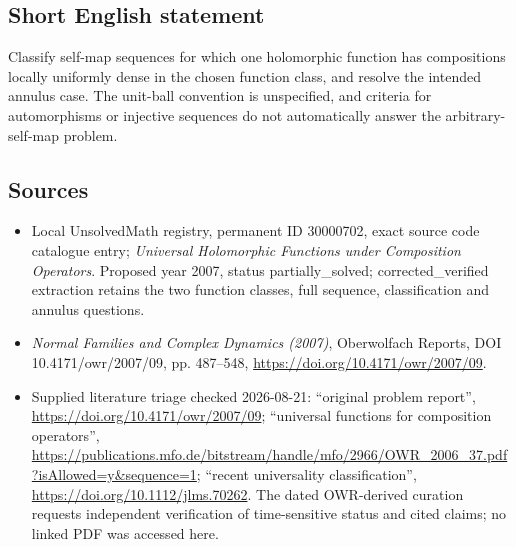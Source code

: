 \documentclass[11pt]{article}
\begin{document}
\subsection{Short English statement}
Classify self-map sequences for which one holomorphic function has compositions locally uniformly dense in the chosen function class, and resolve the intended annulus case. The unit-ball convention is unspecified, and criteria for automorphisms or injective sequences do not automatically answer the arbitrary-self-map problem.
\subsection{Sources}
\begin{itemize}
\item Local UnsolvedMath registry, permanent ID 30000702, exact source code catalogue entry; \emph{Universal Holomorphic Functions under Composition Operators}. Proposed year 2007, status partially\_solved; corrected\_verified extraction retains the two function classes, full sequence, classification and annulus questions.
\item \emph{Normal Families and Complex Dynamics (2007)}, Oberwolfach Reports, DOI 10.4171/owr/2007/09, pp. 487--548, \url{https://doi.org/10.4171/owr/2007/09}.
\item Supplied literature triage checked 2026-08-21: ``original problem report'', \url{https://doi.org/10.4171/owr/2007/09}; ``universal functions for composition operators'', \url{https://publications.mfo.de/bitstream/handle/mfo/2966/OWR_2006_37.pdf?isAllowed=y&sequence=1}; ``recent universality classification'', \url{https://doi.org/10.1112/jlms.70262}. The dated OWR-derived curation requests independent verification of time-sensitive status and cited claims; no linked PDF was accessed here.
\end{itemize}
\end{document}
